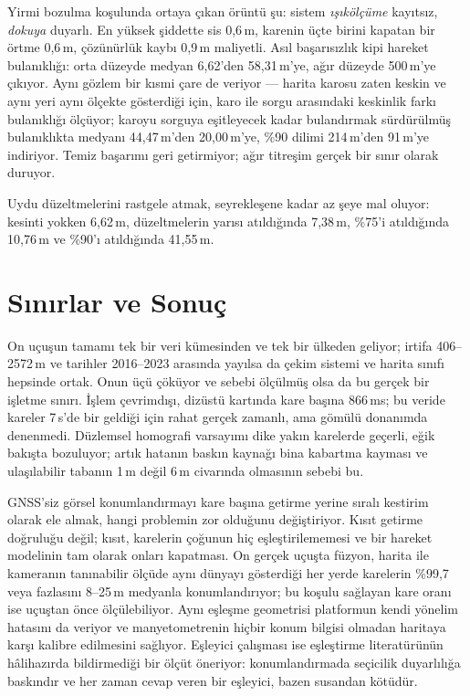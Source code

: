 \documentclass[conference]{IEEEtran}
\begin{document}
Yirmi bozulma koşulunda ortaya çıkan örüntü şu: sistem \emph{ışıkölçüme}
kayıtsız, \emph{dokuya} duyarlı. En yüksek şiddette sis 0,6\,m, karenin üçte
birini kapatan bir örtme 0,6\,m, çözünürlük kaybı 0,9\,m maliyetli. Asıl
başarısızlık kipi hareket bulanıklığı: orta düzeyde medyan 6,62'den 58,31\,m'ye,
ağır düzeyde 500\,m'ye çıkıyor. Aynı gözlem bir kısmi çare de veriyor --- harita
karosu zaten keskin ve aynı yeri aynı ölçekte gösterdiği için, karo ile sorgu
arasındaki keskinlik farkı bulanıklığı ölçüyor; karoyu sorguya eşitleyecek kadar
bulandırmak sürdürülmüş bulanıklıkta medyanı 44,47\,m'den 20,00\,m'ye,
\%90 dilimi 214\,m'den 91\,m'ye indiriyor. Temiz başarımı geri getirmiyor;
ağır titreşim gerçek bir sınır olarak duruyor.

Uydu düzeltmelerini rastgele atmak, seyrekleşene kadar az şeye mal oluyor:
kesinti yokken 6,62\,m, düzeltmelerin yarısı atıldığında 7,38\,m, \%75'i
atıldığında 10,76\,m ve \%90'ı atıldığında 41,55\,m.

\section{Sınırlar ve Sonuç}

On uçuşun tamamı tek bir veri kümesinden ve tek bir ülkeden geliyor; irtifa
406--2572\,m ve tarihler 2016--2023 arasında yayılsa da çekim sistemi ve harita
sınıfı hepsinde ortak. Onun üçü çöküyor ve sebebi ölçülmüş olsa da bu gerçek
bir işletme sınırı. İşlem çevrimdışı, dizüstü kartında kare başına 866\,ms; bu
veride kareler 7\,s'de bir geldiği için rahat gerçek zamanlı, ama gömülü
donanımda denenmedi. Düzlemsel homografi varsayımı dike yakın karelerde geçerli,
eğik bakışta bozuluyor; artık hatanın baskın kaynağı bina kabartma kayması ve
ulaşılabilir tabanın 1\,m değil 6\,m civarında olmasının sebebi bu.

GNSS'siz görsel konumlandırmayı kare başına getirme yerine sıralı kestirim
olarak ele almak, hangi problemin zor olduğunu değiştiriyor. Kısıt getirme
doğruluğu değil; kısıt, karelerin çoğunun hiç eşleştirilememesi ve bir hareket
modelinin tam olarak onları kapatması. On gerçek uçuşta füzyon, harita ile
kameranın tanınabilir ölçüde aynı dünyayı gösterdiği her yerde karelerin
\%99,7 veya fazlasını 8--25\,m medyanla konumlandırıyor; bu koşulu sağlayan
kare oranı ise uçuştan önce ölçülebiliyor. Aynı eşleşme geometrisi platformun
kendi yönelim hatasını da veriyor ve manyetometrenin hiçbir konum bilgisi
olmadan haritaya karşı kalibre edilmesini sağlıyor. Eşleyici çalışması ise
eşleştirme literatürünün hâlihazırda bildirmediği bir ölçüt öneriyor:
konumlandırmada seçicilik duyarlılığa baskındır ve her zaman cevap veren bir
eşleyici, bazen susandan kötüdür.
\end{document}
